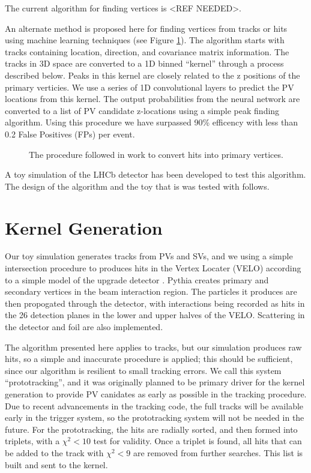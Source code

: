 \documentclass[a4paper]{jpconf}
\begin{document}
The current algorithm for finding vertices is <REF NEEDED>.

An alternate method is proposed here for finding vertices from tracks or hits using machine learning techniques (see Figure \ref{fig:approach}). The algorithm starts with tracks containing location, direction, and covariance matrix information. The tracks in 3D space are converted to a 1D binned ``kernel'' through a process described below. Peaks in this kernel are closely related to the z positions of the primary verticies. We use a series of 1D convolutional layers to predict the PV locations from this kernel. The output probabilities from the neural network are converted to a list of PV candidate z-locations using a simple peak finding algorithm. Using this procedure we have surpassed 90\% efficency with less than 0.2 False Positives (FPs) per event.


\begin{figure}
	\centering
	
	\caption{The procedure followed in work to convert hits into primary vertices.}
	\label{fig:approach}
\end{figure}

A toy simulation of the LHCb detector has been developed to test this algorithm. The design of the algorithm and the toy that is was tested with follows.

\section{Kernel Generation}

Our toy simulation generates tracks from PVs and SVs, and we using a simple intersection procedure to produces hits in the Vertex Locater (VELO) according to a simple model of the upgrade detector \cite{Collaboration:1624070}. Pythia creates primary and secondary vertices in the beam interaction region. The particles it produces are then propogated through the detector, with interactions being recorded as hits in the 26 detection planes in the lower and upper halves of the VELO. Scattering in the detector and foil are also implemented.

The algorithm presented here applies to tracks, but our simulation produces raw hits, so a simple and inaccurate procedure is applied; this should be sufficient, since our algorithm is resilient to small tracking errors. We call this system ``prototracking'', and it was originally planned to be primary driver for the kernel generation to provide PV canidates as early as possible in the tracking procedure. Due to recent advancements in the tracking code, the full tracks will be available early in the trigger system, so the prototracking system will not be needed in the future. For the prototracking, the hits are radially sorted, and then formed into triplets, with a $\chi^2 < 10$ test for validity. Once a triplet is found, all hits that can be added to the track with $\chi^2<9$ are removed from further searches. This list is built and sent to the kernel.
\end{document}
